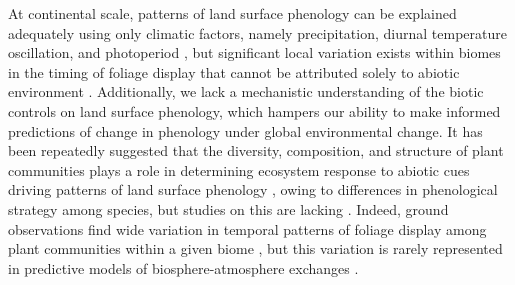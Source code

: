 \documentclass[11pt,a4paper]{article}
\begin{document}
At continental scale, patterns of land surface phenology can be explained
adequately using only climatic factors, namely precipitation, diurnal
temperature oscillation, and photoperiod \citep{Adole2018a, Adole2019,
Guan2014}, but significant local variation exists within biomes in the timing
of foliage display that cannot be attributed solely to abiotic environment
\citep{Stockli2011}. Additionally, we lack a mechanistic understanding of the
biotic controls on land surface phenology, which hampers our ability to make
informed predictions of change in phenology under global environmental change.
It has been repeatedly suggested that the diversity, composition, and structure
of plant communities plays a role in determining ecosystem response to abiotic
cues driving patterns of land surface phenology \citep{Adole2018b,
Jeganathan2014, Fuller1999}, owing to differences in phenological strategy
among species, but studies on this are lacking \citep{Ma2022}. Indeed, ground
observations find wide variation in temporal patterns of foliage display among
plant communities within a given biome \citep{Seyednasrollah2019}, but this
variation is rarely represented in predictive models of biosphere-atmosphere
exchanges \citep{Scheiter2013, Pavlick2013}.
\end{document}
